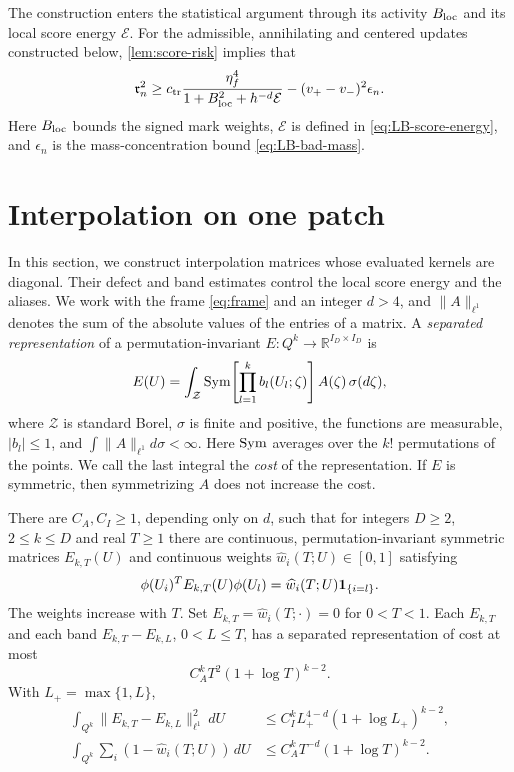 The construction enters the statistical argument through its
activity $B_{\rm loc}$ and its local score energy $\mathcal E$. For
the admissible, annihilating and centered updates constructed below,
\cref{lem:score-risk} implies that
\begin{equation}\label{eq:LB-cost-risk}
 \mathfrak r_n^2\ge
 c_{\rm tr}\frac{\eta_f^4}{1+B_{\rm loc}^2+h^{-d}\mathcal E}
 -(v_+-v_-)^2\epsilon_n.
\end{equation}
Here $B_{\rm loc}$ bounds the signed mark weights, $\mathcal E$ is
defined in \eqref{eq:LB-score-energy}, and $\epsilon_n$ is the
mass-concentration bound \eqref{eq:LB-bad-mass}.
\section{Interpolation on one patch}\label{sec:interp}

In this section, we construct interpolation matrices whose evaluated
kernels are diagonal. Their defect and band estimates control the local
score energy and the aliases. We work with the frame \eqref{eq:frame}
and an integer $d>4$, and $\|A\|_{\ell^1}$ denotes the sum of the absolute
values of the entries of a matrix. A \emph{separated representation}
of a permutation-invariant
$E:Q^k\to\mathbb R^{I_D\times I_D}$ is
\[
 E(U)=\int_{\mathcal Z}
 \operatorname{Sym}\!\left[\prod_{l=1}^k b_l(U_l;\zeta)\right]A(\zeta)\,\sigma(d\zeta),
\]
where $\mathcal Z$ is standard Borel, $\sigma$ is finite and positive,
the functions are measurable, $|b_l|\le1$, and
$\int\|A\|_{\ell^1}d\sigma<\infty$. Here $\operatorname{Sym}$ averages over the
$k!$ permutations of the points. We call the last integral the
\emph{cost} of the representation. If $E$ is symmetric, then
symmetrizing $A$ does not increase the cost.

\begin{lemma}\label{lem:interp}
There are $C_A,C_I\ge1$, depending only on $d$, such that for integers
$D\ge2$, $2\le k\le D$ and real $T\ge1$ there are continuous,
permutation-invariant symmetric matrices $E_{k,T}(U)$ and continuous
weights $\widehat w_i(T;U)\in[0,1]$ satisfying
\begin{equation}\label{eq:interp-diag}
 \phi(U_i)^TE_{k,T}(U)\phi(U_l)
 =\widehat w_i(T;U)\mathbf 1_{\{i=l\}}.
\end{equation}
The weights increase with $T$. Set $E_{k,T}=\widehat w_i(T;\cdot)=0$
for $0<T<1$. Each $E_{k,T}$ and each band $E_{k,T}-E_{k,L}$,
$0<L\le T$, has a separated representation of cost at most
\begin{equation}\label{eq:interp-cost}
 C_A^kT^2(1+\log T)^{k-2}.
\end{equation}
With $L_+=\max\{1,L\}$,
\begin{align}
 \int_{Q^k}\|E_{k,T}-E_{k,L}\|_{\ell^1}^2\,dU
 &\le C_I^kL_+^{4-d}(1+\log L_+)^{k-2},
 \label{eq:interp-l2}\\
 \int_{Q^k}\sum_i(1-\widehat w_i(T;U))\,dU
 &\le C_A^kT^{-d}(1+\log T)^{k-2}.
 \label{eq:interp-defect}
\end{align}
\end{lemma}

